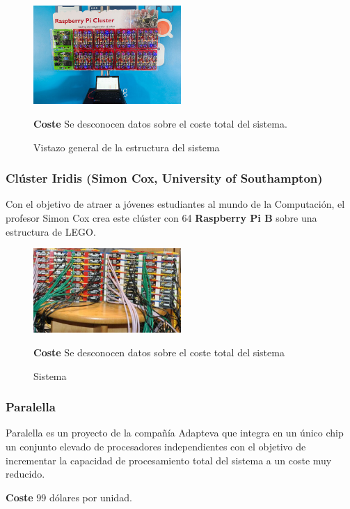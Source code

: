 \begin{figure}[H]
\centering
\includegraphics[width=0.5\textwidth]{Chapters/Chapter1/Figures/bramblegchq}
\caption{Vistazo general de la estructura del sistema}
\label{gchq:bramble}

\textbf{Coste} Se desconocen datos sobre el coste total del sistema.

\end{figure}

\subsubsection{Clúster Iridis (Simon Cox, University of Southampton)}

Con el objetivo de atraer a jóvenes estudiantes al mundo de la Computación, el profesor Simon Cox crea este clúster con 64 \textbf{Raspberry Pi B} sobre una estructura de LEGO\cite{cox:raspberry}.
\begin{figure}[H]
\centering
\includegraphics[width=0.5\textwidth]{Chapters/Chapter1/Figures/iridis-pi.jpg}
\caption{Sistema}
\label{cox:iridis}

\textbf{Coste} Se desconocen datos sobre el coste total del sistema

\end{figure}

\subsubsection{Paralella}

Paralella es un proyecto de la compañía Adapteva que integra en un único chip un conjunto elevado de procesadores independientes con el objetivo de incrementar la capacidad de procesamiento total del sistema a un coste muy reducido\cite{paralella}.

\textbf{Coste} 99 dólares por unidad.